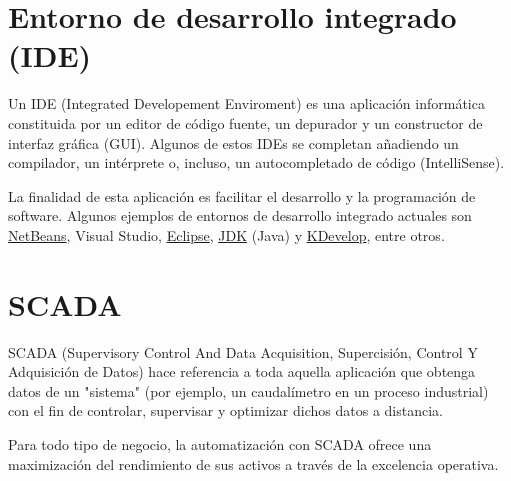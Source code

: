 \section{Entorno de desarrollo integrado (IDE)}

Un IDE (Integrated Developement Enviroment) es una aplicación informática constituida por un editor de código fuente, un depurador y un constructor de interfaz gráfica (GUI). Algunos de estos IDEs se completan añadiendo un compilador, un intérprete o, incluso, un autocompletado de código (IntelliSense).

La finalidad de esta aplicación es facilitar el desarrollo y la programación de software. Algunos ejemplos de entornos de desarrollo integrado actuales son \href{https://netbeans.org/}{NetBeans}, Visual Studio, \href{https://www.eclipse.org/}{Eclipse}, \href{https://www.oracle.com/technetwork/java/javase/downloads/jdk8-downloads-2133151.html}{JDK} (Java) y \href{https://www.kdevelop.org/}{KDevelop}, entre otros.


\section{SCADA}

SCADA (Supervisory Control And Data Acquisition, Supercisión, Control Y Adquisición de Datos) hace referencia a toda aquella aplicación que obtenga datos de un "sistema" (por ejemplo, un caudalímetro en un proceso industrial) con el fin de controlar, supervisar y optimizar dichos datos a distancia.

Para todo tipo de negocio, la automatización con SCADA ofrece una maximización del rendimiento de sus activos a través de la excelencia operativa.

